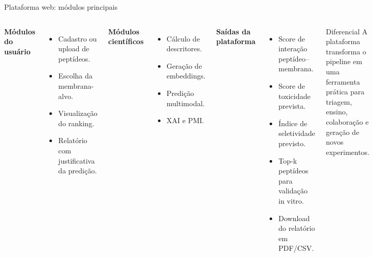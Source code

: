\documentclass[aspectratio=169,10pt]{beamer}
\begin{document}
\begin{frame}{Plataforma web: módulos principais}
\begin{columns}[T]
\textbf{Módulos do usuário}
\begin{itemize}
  \item Cadastro ou upload de peptídeos.
  \item Escolha da membrana-alvo.
  \item Visualização do ranking.
  \item Relatório com justificativa da predição.
\end{itemize}
\vspace{0.2cm}
\textbf{Módulos científicos}
\begin{itemize}
  \item Cálculo de descritores.
  \item Geração de embeddings.
  \item Predição multimodal.
  \item XAI e PMI.
\end{itemize}
\textbf{Saídas da plataforma}
\begin{itemize}
  \item Score de interação peptídeo--membrana.
  \item Score de toxicidade prevista.
  \item Índice de seletividade previsto.
  \item Top-k peptídeos para validação in vitro.
  \item Download do relatório em PDF/CSV.
\end{itemize}
\begin{block}{Diferencial}
A plataforma transforma o pipeline em uma ferramenta prática para triagem, ensino, colaboração e geração de novos experimentos.
\end{block}
\end{columns}
\end{frame}
\end{document}
